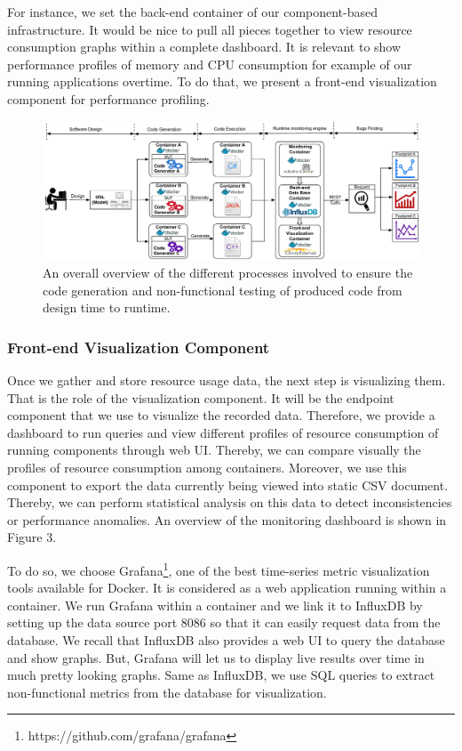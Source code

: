 For instance, we set the back-end container of our component-based infrastructure. It would be nice to pull all pieces together to view resource consumption graphs within a complete dashboard. It is relevant to show performance profiles of memory and CPU consumption for example of our running applications overtime. To do that, we present a front-end visualization component for performance profiling. 
\begin{figure}[h]
	\includegraphics[width=1\linewidth]{Ressources/background2.pdf}
	\caption{An overall overview of the different processes involved to ensure the code generation and non-functional testing of produced code from design time to runtime.}
\end{figure}
\subsubsection{Front-end Visualization Component}
Once we gather and store resource usage data, the next step is visualizing them. That is the role of the visualization component. It will be the endpoint component that we use to visualize the recorded data. Therefore, we provide a dashboard to run queries and view different profiles of resource consumption of running components through web UI. Thereby, we can compare visually the profiles of resource consumption among containers. Moreover, we use this component to export the data currently being viewed into static CSV document. Thereby, we can perform statistical analysis on this data to detect inconsistencies or performance anomalies. An overview of the monitoring dashboard is shown in Figure 3.

To do so, we choose Grafana\footnote{https://github.com/grafana/grafana}, one of the best time-series metric visualization tools available for Docker. It is considered as a web application running within a container. We run Grafana within a container and we link it to InfluxDB by setting up the data source port 8086 so that it can easily request data from the database. 
We recall that InfluxDB also provides a web UI to query the database and show graphs. But, Grafana will let us to display live results over time in much pretty looking graphs. Same as InfluxDB, we use SQL queries to extract non-functional metrics from the database for visualization.

